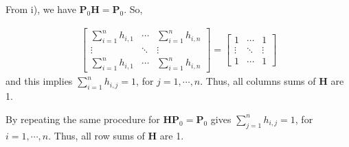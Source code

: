 From i), we have $\bm{P}_{0}\bm{H} = \bm{P}_{0}$. So,

\begin{align*}
\begin{bmatrix}
\sum_{i=1}^{n} h_{i,1} & \cdots & \sum_{i=1}^{n} h_{i,n}\\
\vdots & \ddots & \vdots\\
\sum_{i=1}^{n} h_{i,1} & \cdots & \sum_{i=1}^{n} h_{i,n}
\end{bmatrix}
=
\begin{bmatrix}
1 & \cdots & 1\\
\vdots & \ddots & \vdots\\
1 & \cdots & 1
\end{bmatrix}
\end{align*}
and this implies $\sum_{i=1}^{n} h_{i,j} = 1$, for $j = 1, \cdots, n$.
Thus, all columns sums of $\bm{H}$ are 1.

By repeating the same procedure for $\bm{H}\bm{P}_{0} = \bm{P}_{0}$ gives
$\sum_{j=1}^{n} h_{i,j} = 1$, for $i = 1, \cdots, n$. Thus, all row sums of $\bm{H}$ are 1.